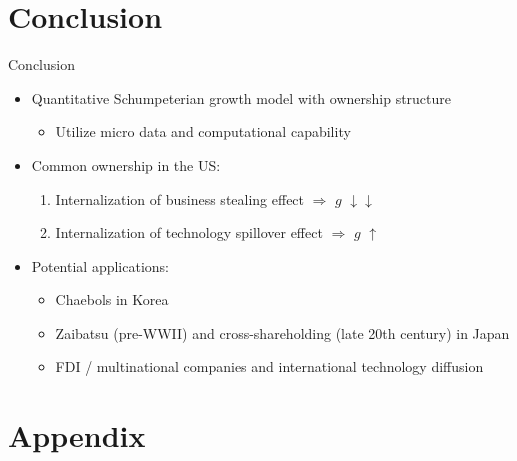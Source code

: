 \documentclass[
  10pt,               %
  aspectratio=169,    %
]{beamer}
\theoremstyle{plain}
\begin{document}
\section{Conclusion}
\begin{frame}{Conclusion}
  \begin{itemize}
    \item Quantitative Schumpeterian growth model with ownership structure
          \begin{itemize}
            \item Utilize micro data and computational capability
          \end{itemize}
          \medskip{}
    \item Common ownership in the US:
          \begin{enumerate}
            \item Internalization of business stealing effect $\Longrightarrow$ $g$ $\downarrow$$\downarrow$
            \item Internalization of technology spillover effect $\Longrightarrow$ $g$ $\uparrow$
          \end{enumerate}
          \medskip{}
    \item Potential applications:
          \begin{itemize}
            \item Chaebols in Korea
            \item Zaibatsu (pre-WWII) and cross-shareholding (late 20th century) in Japan
            \item FDI / multinational companies and international technology diffusion
          \end{itemize}
  \end{itemize}
\end{frame}

\appendix

\section{Appendix}
\end{document}
